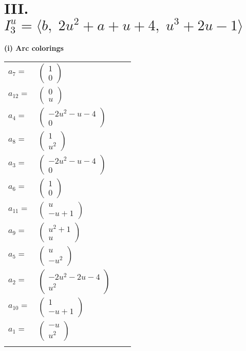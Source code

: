 \documentclass[1p]{elsarticle_modified}
\theoremstyle{definition}
\begin{document}
\centering \section*{III. $I^u_{3}= \langle b,\;2 u^2+a+u+4,\;u^3+2 u-1 \rangle$}
\flushleft \textbf{(i) Arc colorings}\\
\begin{tabular}{m{7pt} m{180pt} m{7pt} m{180pt} }
\flushright $a_{7}=$&$\begin{pmatrix}1\\0\end{pmatrix}$ \\
\flushright $a_{12}=$&$\begin{pmatrix}0\\u\end{pmatrix}$ \\
\flushright $a_{4}=$&$\begin{pmatrix}-2 u^2- u-4\\0\end{pmatrix}$ \\
\flushright $a_{8}=$&$\begin{pmatrix}1\\u^2\end{pmatrix}$ \\
\flushright $a_{3}=$&$\begin{pmatrix}-2 u^2- u-4\\0\end{pmatrix}$ \\
\flushright $a_{6}=$&$\begin{pmatrix}1\\0\end{pmatrix}$ \\
\flushright $a_{11}=$&$\begin{pmatrix}u\\- u+1\end{pmatrix}$ \\
\flushright $a_{9}=$&$\begin{pmatrix}u^2+1\\u\end{pmatrix}$ \\
\flushright $a_{5}=$&$\begin{pmatrix}u\\- u^2\end{pmatrix}$ \\
\flushright $a_{2}=$&$\begin{pmatrix}-2 u^2-2 u-4\\u^2\end{pmatrix}$ \\
\flushright $a_{10}=$&$\begin{pmatrix}1\\- u+1\end{pmatrix}$ \\
\flushright $a_{1}=$&$\begin{pmatrix}- u\\u^2\end{pmatrix}$\\&\end{tabular}
\end{document}
